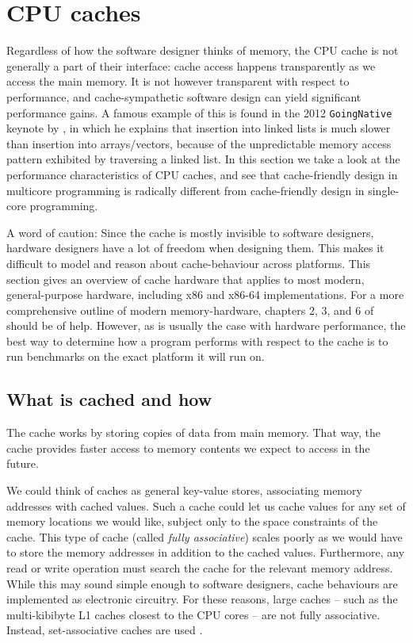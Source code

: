 \section{CPU caches}
\label{sec:caches}
Regardless of how the software designer thinks of memory, the CPU cache is not
generally a part of their interface: cache access happens transparently as we
access the main memory. It is not however transparent with
respect to performance, and cache-sympathetic software design can yield
significant performance gains. A famous example of this is found in the 2012
\texttt{GoingNative} keynote by \citeauthor{stroustrup} \cite{stroustrup}, in
which he explains that insertion into linked lists is much slower than
insertion into arrays/vectors, because of the unpredictable memory access
pattern exhibited by traversing a linked list. In this section we take a look
at the performance characteristics of CPU caches, and see that cache-friendly
design in multicore programming is radically different from cache-friendly
design in single-core programming.

A word of caution:
Since the cache is mostly invisible to software designers, hardware designers
have a lot of freedom when designing them. This makes it difficult to model and
reason about cache-behaviour across platforms. This section gives an overview
of cache hardware that applies to most modern, general-purpose hardware,
including x86 and x86-64 implementations. For a more comprehensive outline of
modern memory-hardware, chapters 2, 3, and 6 of
\cite{whatprogrammersshouldknow} should be of help. However, as is usually the
case with hardware performance, the best way to determine how a program
performs with respect to the cache is to run benchmarks on the exact platform
it will run on.

\subsection{What is cached and how} The cache works by storing copies
of data from main memory. That way, the cache provides faster access to
memory contents we expect to access in the future.

We could think of caches as general key-value stores, associating memory
addresses with cached values. Such a cache could let us cache values for any
set of memory locations we would like, subject only to the space constraints of
the cache. This type of cache (called \textit{fully associative}) scales
poorly as we would have to store the memory addresses in addition to the cached
values. Furthermore, any read or write operation must search the cache for the
relevant memory address. While this may sound simple enough to software
designers, cache behaviours are implemented as electronic circuitry. For these
reasons, large caches -- such as the multi-kibibyte L1 caches closest to the CPU
cores -- are not fully associative. Instead, set-associative caches are used
\cite{whatprogrammersshouldknow} \cite{mckenny-barriers}.


